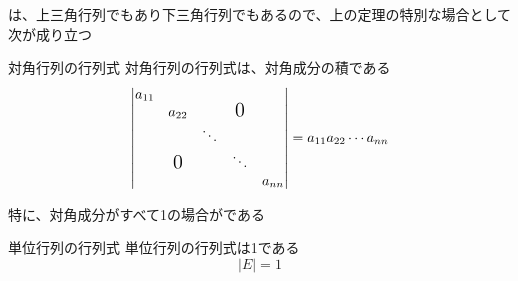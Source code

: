 \documentclass[../../../topic_linear-algebra]{subfiles}
\begin{document}
\sectionline

は、上三角行列でもあり下三角行列でもあるので、上の定理の特別な場合として次が成り立つ

\begin{theorem}{対角行列の行列式}
  対角行列の行列式は、対角成分の積である
  \begin{equation*}
    \left|\begin{matrix}
      a_{11}                                                   \\
       & a_{22}           &        & \text{\Large{0}}          \\
       &                  & \ddots                             \\
       & \text{\Large{0}} &        & \ddots                    \\
       &                  &        &                  & a_{nn}
    \end{matrix}\right| = a_{11} a_{22} \cdots a_{nn}
  \end{equation*}
\end{theorem}

特に、対角成分がすべて1の場合がである

\begin{theorem}{単位行列の行列式}
  単位行列の行列式は1である
  \begin{equation*}
    | E | = 1
  \end{equation*}
\end{theorem}
\end{document}
